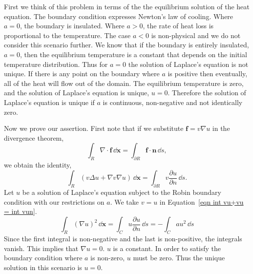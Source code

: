 {\begin{Solution}
First we think of this problem in terms of the the equilibrium solution of the 
heat equation.  The boundary condition expresses Newton's law of cooling.
Where $a = 0$, the boundary is insulated.  Where $a > 0$, the rate of heat
loss is proportional to the temperature.  The case $a < 0$ is non-physical
and we do not consider this scenario further.
We know that if the boundary is entirely insulated, $a = 0$, then the 
equilibrium temperature is a constant that depends on the initial 
temperature distribution.  Thus for $a = 0$ the solution of Laplace's equation
is not unique.  If there is any point on the boundary where $a$ is positive
then eventually, all of the heat will flow out of the domain.  The equilibrium
temperature is zero, and the solution of Laplace's equation is unique, 
$u = 0$.  Therefore the solution of Laplace's equation is unique if 
$a$ is continuous, non-negative and not identically zero.



Now we prove our assertion.  First note that if we substitute 
$\mathbf{f} = v \nabla u$ in the divergence theorem,
\[
\int_R \nabla \cdot \mathbf{f} \,\dd \mathbf{x} 
= \int_{\partial R} \mathbf{f} \cdot \mathbf{n} \,\dd s,
\]
we obtain the identity,
\begin{equation}
  \label{eqn int vu+vu = int vun}
  \int_R ( v \Delta u + \nabla v \nabla u ) \,\dd \mathbf{x} 
  = \int_{\partial R} v \frac{\partial u}{\partial n} \,\dd s.
\end{equation}
Let $u$ be a solution of Laplace's equation subject to the Robin boundary
condition with our restrictions on $a$.  We take $v = u$ in
Equation~\ref{eqn int vu+vu = int vun}.
\[
  \int_R (\nabla u)^2 \,\dd \mathbf{x} 
  = \int_C u \frac{\partial u}{\partial n} \,\dd s
  = - \int_C a u^2 \,\dd s
\]
Since the first integral is non-negative and the last is non-positive, 
the integrals vanish.  This implies that $\nabla u = 0$.  $u$ is a constant.
In order to satisfy the boundary condition where $a$ is non-zero, $u$ must
be zero.  Thus the unique solution in this scenario is $u = 0$.
\end{Solution}










}

